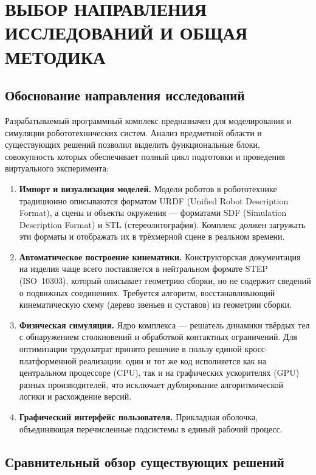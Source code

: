 \chapter{ВЫБОР НАПРАВЛЕНИЯ ИССЛЕДОВАНИЙ И ОБЩАЯ МЕТОДИКА}
\label{cha:method}

\section{Обоснование направления исследований}

Разрабатываемый программный комплекс предназначен для моделирования и симуляции
робототехнических систем. Анализ предметной области и существующих решений
позволил выделить функциональные блоки, совокупность которых обеспечивает полный
цикл подготовки и проведения виртуального эксперимента:

\begin{enumerate}
  \item \textbf{Импорт и визуализация моделей.} Модели роботов в робототехнике
        традиционно описываются форматом URDF (Unified Robot Description Format),
        а сцены и объекты окружения --- форматами SDF (Simulation Description
        Format) и STL (стереолитография). Комплекс должен загружать эти форматы и
        отображать их в трёхмерной сцене в реальном времени.
  \item \textbf{Автоматическое построение кинематики.} Конструкторская
        документация на изделия чаще всего поставляется в нейтральном формате
        STEP (ISO~10303), который описывает геометрию сборки, но не содержит
        сведений о подвижных соединениях. Требуется алгоритм, восстанавливающий
        кинематическую схему (дерево звеньев и суставов) из геометрии сборки.
  \item \textbf{Физическая симуляция.} Ядро комплекса --- решатель динамики
        твёрдых тел с обнаружением столкновений и обработкой контактных
        ограничений. Для оптимизации трудозатрат принято решение в пользу
        единой кросс-платформенной реализации: один и тот же код исполняется
        как на центральном процессоре (CPU), так и на графических ускорителях
        (GPU) разных производителей, что исключает дублирование
        алгоритмической логики и расхождение версий.
  \item \textbf{Графический интерфейс пользователя.} Прикладная оболочка,
        объединяющая перечисленные подсистемы в единый рабочий процесс.
\end{enumerate}

\section{Сравнительный обзор существующих решений}

